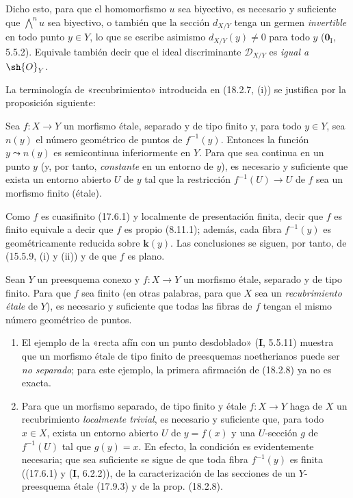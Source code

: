 
Dicho esto, para que el homomorfismo $u$ sea biyectivo, es necesario y suficiente que $\bigwedge^n u$ sea biyectivo, o también que la sección $d_{X/Y}$ tenga un germen \emph{invertible} en todo punto $y\in Y$, lo que se escribe asimismo $d_{X/Y}(y)\neq 0$ para todo $y$ ($\mathbf 0_{\mathrm I}$, 5.5.2). Equivale también decir que el ideal discriminante $\mathscr{D}_{X/Y}$ es \emph{igual a $\sh{O}_Y$}.

La terminología de «recubrimiento» introducida en (18.2.7, (i)) se justifica por la proposición siguiente:

\begin{proposition}[18.2.8]
\label{IV.18.2.8}
Sea $f:X\to Y$ un morfismo étale, separado y de tipo finito y, para todo $y\in Y$, sea $n(y)$ el número geométrico de puntos de $f^{-1}(y)$. Entonces la función $y\leadsto n(y)$ es semicontinua inferiormente en $Y$. Para que sea continua en un punto $y$ \textup{(y, por tanto, \emph{constante} en un entorno de $y$)}, es necesario y suficiente que exista un entorno abierto $U$ de $y$ tal que la restricción $f^{-1}(U)\to U$ de $f$ sea un morfismo finito (étale).
\end{proposition}

Como $f$ es cuasifinito (17.6.1) y localmente de presentación finita, decir que $f$ es finito equivale a decir que $f$ es propio (8.11.1); además, cada fibra $f^{-1}(y)$ es geométricamente reducida sobre $\boldsymbol k(y)$. Las conclusiones se siguen, por tanto, de (15.5.9, (i) y (ii)) y de que $f$ es plano.

\begin{corollary}[18.2.9]
\label{IV.18.2.9}
Sean $Y$ un preesquema conexo y $f:X\to Y$ un morfismo étale, separado y de tipo finito. Para que $f$ sea finito \textup{(en otras palabras, para que $X$ sea un \emph{recubrimiento étale} de $Y$)}, es necesario y suficiente que todas las fibras de $f$ tengan el mismo número geométrico de puntos.
\end{corollary}

\begin{remarks}[18.2.10]
\label{IV.18.2.10}
\begin{enumerate}
  \item[(i)] El ejemplo de la «recta afín con un punto desdoblado» (\textbf I, 5.5.11) muestra que un morfismo étale de tipo finito de preesquemas noetherianos puede ser \emph{no separado}; para este ejemplo, la primera afirmación de (18.2.8) ya no es exacta.

  \item[(ii)] Para que un morfismo separado, de tipo finito y étale $f:X\to Y$ haga de $X$ un recubrimiento \emph{localmente trivial}, es necesario y suficiente que, para todo $x\in X$, exista un entorno abierto $U$ de $y=f(x)$ y una $U$-sección $g$ de $f^{-1}(U)$ tal que $g(y)=x$. En efecto, la condición es evidentemente necesaria; que sea suficiente se sigue de que toda fibra $f^{-1}(y)$ es finita ((17.6.1) y (\textbf I, 6.2.2)), de la caracterización de las secciones de un $Y$-preesquema étale (17.9.3) y de la prop. (18.2.8).
\end{enumerate}
\end{remarks}
